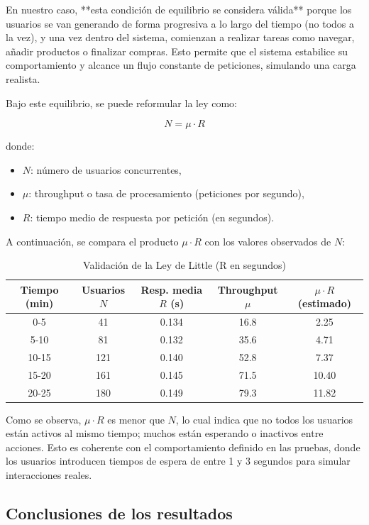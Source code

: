 \documentclass[10pt]{book}
\begin{document}
En nuestro caso, **esta condición de equilibrio se considera válida** porque los usuarios se van generando de forma progresiva a lo largo del tiempo (no todos a la vez), y una vez dentro del sistema, comienzan a realizar tareas como navegar, añadir productos o finalizar compras. Esto permite que el sistema estabilice su comportamiento y alcance un flujo constante de peticiones, simulando una carga realista.

Bajo este equilibrio, se puede reformular la ley como:

\[
N = \mu \cdot R
\]

donde:

\begin{itemize}
    \item \(N\): número de usuarios concurrentes,
    \item \(\mu\): throughput o tasa de procesamiento (peticiones por segundo),
    \item \(R\): tiempo medio de respuesta por petición (en segundos).
\end{itemize}

A continuación, se compara el producto \(\mu \cdot R\) con los valores observados de \(N\):

\begin{table}[H]
\centering
\begin{tabular}{|c|c|c|c|c|}
\hline
\textbf{Tiempo (min)} & \textbf{Usuarios \(N\)} & \textbf{Resp. media \(R\) (s)} & \textbf{Throughput \(\mu\)} & \(\mu \cdot R\) (estimado) \\
\hline
0-5  & 41  & 0.134 & 16.8  & 2.25 \\
5-10 & 81  & 0.132 & 35.6  & 4.71 \\
10-15 & 121 & 0.140 & 52.8  & 7.37 \\
15-20 & 161 & 0.145 & 71.5  & 10.40 \\
20-25 & 180 & 0.149 & 79.3  & 11.82 \\
\hline
\end{tabular}
\caption{Validación de la Ley de Little (R en segundos)}
\end{table}

Como se observa, \(\mu \cdot R\) es menor que \(N\), lo cual indica que no todos los usuarios están activos al mismo tiempo; muchos están esperando o inactivos entre acciones. Esto es coherente con el comportamiento definido en las pruebas, donde los usuarios introducen tiempos de espera de entre 1 y 3 segundos para simular interacciones reales.

\subsection{Conclusiones de los resultados}
\end{document}
